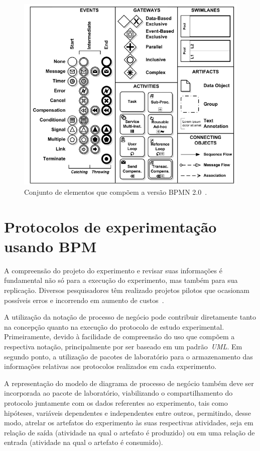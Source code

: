 \begin{figure}[!ht]
\centering
\includegraphics[width=\textwidth]{images/elementos.png}
\caption{Conjunto de elementos que compõem a versão BPMN 2.0~\cite{object2016business}.}
\label{img:elementos}
\end{figure}

\section{Protocolos de experimentação usando BPM}

A compreensão do projeto do experimento e revisar suas informações é fundamental não só para a execução do experimento, mas também para sua replicação. Diversos pesquisadores têm realizado projetos pilotos que ocasionam  possíveis erros e incorrendo em aumento de custos~\cite{Kitchenham2008}. 

A utilização da notação de processo de negócio pode contribuir diretamente tanto na concepção quanto na execução do protocolo de estudo experimental. Primeiramente, devido à facilidade de compreensão do uso que compõem a respectiva notação, principalmente por ser baseado em um padrão~\textit{UML}. Em segundo ponto, a utilização de pacotes de laboratório para o armazenamento das informações relativas aos protocolos realizados em cada experimento.

A representação do modelo de diagrama de processo de negócio também deve ser incorporada ao pacote de laboratório, viabilizando o compartilhamento do protocolo juntamente com os dados referentes ao experimento, tais como hipóteses, variáveis dependentes e independentes entre outros, permitindo, desse modo, atrelar os artefatos do experimento às suas respectivas atividades, seja em relação de saída (atividade na qual o artefato é produzido) ou em uma relação de entrada (atividade na qual o artefato é consumido).


